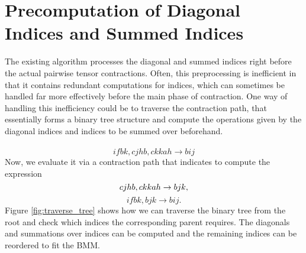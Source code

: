 \section{Precomputation of Diagonal Indices and Summed Indices}
The existing algorithm processes the diagonal and summed indices right before the actual pairwise 
tensor contractions. Often, this preprocessing is inefficient in
that it contains redundant computations for indices, which can sometimes be handled far more
effectively before the main phase of contraction. One way of handling this inefficiency could
be to traverse the contraction path, that essentially forms a binary tree structure and compute
the operations given by the diagonal indices and indices to be summed over beforehand. 
\\
\\
\begin{equation*}
    ifbk, cjhb, ckkah \rightarrow bij
\end{equation*}
Now, we evaluate it via a contraction path that indicates to compute the expression
\begin{equation*}
    \vspace{-1mm}
    cjhb, ckkah \rightarrow bjk,
\end{equation*}
\begin{equation*}
    ifbk, bjk \rightarrow bij.
\end{equation*}
Figure \ref{fig:traverse_tree} shows how we can traverse the binary tree from the root and
check which indices the corresponding parent requires. The diagonals and summations over indices
can be computed and the remaining indices can be reordered to fit the BMM.
\\

